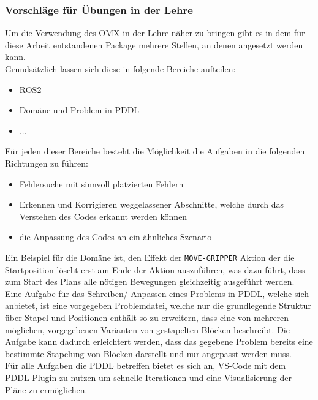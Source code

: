 \subsubsection{Vorschläge für Übungen in der Lehre}
Um die Verwendung des OMX in der Lehre näher zu bringen gibt es in dem für diese Arbeit entstandenen Package mehrere Stellen, an denen angesetzt werden kann.\\
Grundsätzlich lassen sich diese in folgende Bereiche aufteilen:
\begin{itemize}
\item \ac{ROS2}
\item Domäne und Problem in PDDL
\item ...
\end{itemize}
Für jeden dieser Bereiche besteht die Möglichkeit die Aufgaben in die folgenden Richtungen zu führen:
\begin{itemize}
\item Fehlersuche mit sinnvoll platzierten Fehlern
\item Erkennen und Korrigieren weggelassener Abschnitte, welche durch das Verstehen des Codes erkannt werden können
\item die Anpassung des Codes an ein ähnliches Szenario
\end{itemize}
Ein Beispiel für die Domäne ist, den Effekt der \verb|MOVE-GRIPPER| Aktion der die Startposition löscht erst am Ende der Aktion auszuführen, was dazu führt, dass zum Start des Plans alle nötigen Bewegungen gleichzeitig ausgeführt werden.\\
Eine Aufgabe für das Schreiben/ Anpassen eines Problems in PDDL, welche sich anbietet, ist eine vorgegeben Problemdatei, welche nur die grundlegende Struktur über Stapel und Positionen enthält so zu erweitern, dass eine von mehreren möglichen, vorgegebenen Varianten von gestapelten Blöcken beschreibt. Die Aufgabe kann dadurch erleichtert werden, dass das gegebene Problem bereits eine bestimmte Stapelung von Blöcken darstellt und nur angepasst werden muss.\\
Für alle Aufgaben die PDDL betreffen bietet es sich an, VS-Code mit dem PDDL-Plugin zu nutzen um schnelle Iterationen und eine Visualisierung der Pläne zu ermöglichen.